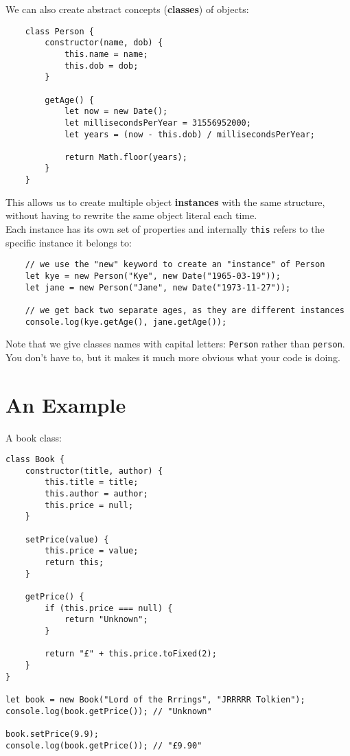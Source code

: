 We can also create abstract concepts (\textbf{classes}) of objects:

\begin{verbatim}
    class Person {
        constructor(name, dob) {
            this.name = name;
            this.dob = dob;
        }

        getAge() {
            let now = new Date();
            let millisecondsPerYear = 31556952000;
            let years = (now - this.dob) / millisecondsPerYear;

            return Math.floor(years);
        }
    }
\end{verbatim}

This allows us to create multiple object \textbf{instances} with the same structure, without having to rewrite the same object literal each time.
\\

Each instance has its own set of properties and internally \texttt{this} refers to the specific instance it belongs to:

\begin{verbatim}
    // we use the "new" keyword to create an "instance" of Person
    let kye = new Person("Kye", new Date("1965-03-19"));
    let jane = new Person("Jane", new Date("1973-11-27"));

    // we get back two separate ages, as they are different instances
    console.log(kye.getAge(), jane.getAge());
\end{verbatim}

Note that we give classes names with capital letters: \texttt{Person} rather than \texttt{person}. You don't have to, but it makes it much more obvious what your code is doing.


\section{An Example}

A book class:

\begin{verbatim}
class Book {
    constructor(title, author) {
        this.title = title;
        this.author = author;
        this.price = null;
    }

    setPrice(value) {
        this.price = value;
        return this;
    }

    getPrice() {
        if (this.price === null) {
            return "Unknown";
        }

        return "£" + this.price.toFixed(2);
    }
}

let book = new Book("Lord of the Rrrings", "JRRRRR Tolkien");
console.log(book.getPrice()); // "Unknown"

book.setPrice(9.9);
console.log(book.getPrice()); // "£9.90"
\end{verbatim}

